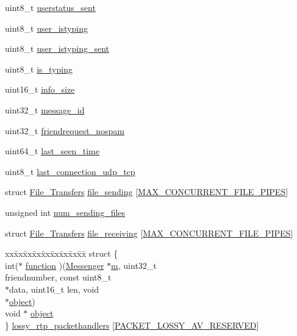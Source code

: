\begin{DoxyCompactItemize}
\item 
uint8\+\_\+t \hyperlink{struct_friend_af7c74fd36acb972c3a8641fb0781e37e}{userstatus\+\_\+sent}
\item 
uint8\+\_\+t \hyperlink{struct_friend_a68e945edd5a63c22371edf481c788d88}{user\+\_\+istyping}
\item 
uint8\+\_\+t \hyperlink{struct_friend_a8d9e9aef86444e0cde8ec0314f60907e}{user\+\_\+istyping\+\_\+sent}
\item 
uint8\+\_\+t \hyperlink{struct_friend_a4eb96aff01799d54246cc48854a47175}{is\+\_\+typing}
\item 
uint16\+\_\+t \hyperlink{struct_friend_ac0ae002db55ef8f8366de10ec005b65a}{info\+\_\+size}
\item 
uint32\+\_\+t \hyperlink{struct_friend_aa4420a99dd00b4884b23150e4226b2ea}{message\+\_\+id}
\item 
uint32\+\_\+t \hyperlink{struct_friend_a0fae9801a4789a368f90125119e31f3f}{friendrequest\+\_\+nospam}
\item 
uint64\+\_\+t \hyperlink{struct_friend_a8f99c48eb6b3ea472806495135ab6792}{last\+\_\+seen\+\_\+time}
\item 
uint8\+\_\+t \hyperlink{struct_friend_ac213b32e59c2e4a64923c453b100c4e4}{last\+\_\+connection\+\_\+udp\+\_\+tcp}
\item 
struct \hyperlink{struct_file___transfers}{File\+\_\+\+Transfers} \hyperlink{struct_friend_a51d0849a59878ad9e4b67123a1c87037}{file\+\_\+sending} \mbox{[}\hyperlink{_messenger_8h_a5e5c08c689138cd56d6c1a16d3eea793}{M\+A\+X\+\_\+\+C\+O\+N\+C\+U\+R\+R\+E\+N\+T\+\_\+\+F\+I\+L\+E\+\_\+\+P\+I\+P\+E\+S}\mbox{]}
\item 
unsigned int \hyperlink{struct_friend_ac4dcaccdfc6f354a321622e84b27b856}{num\+\_\+sending\+\_\+files}
\item 
struct \hyperlink{struct_file___transfers}{File\+\_\+\+Transfers} \hyperlink{struct_friend_ab14e1c3452717012d0bbb0dad068e9f6}{file\+\_\+receiving} \mbox{[}\hyperlink{_messenger_8h_a5e5c08c689138cd56d6c1a16d3eea793}{M\+A\+X\+\_\+\+C\+O\+N\+C\+U\+R\+R\+E\+N\+T\+\_\+\+F\+I\+L\+E\+\_\+\+P\+I\+P\+E\+S}\mbox{]}
\item 
\begin{tabbing}
xx\=xx\=xx\=xx\=xx\=xx\=xx\=xx\=xx\=\kill
struct \{\\
\>int($\ast$ \hyperlink{struct_friend_a726a4dcb820b33fd434494d56f532867}{function} )(\hyperlink{struct_messenger}{Messenger} $\ast$\hyperlink{_messenger__test_8c_aea6eb6c7c30a659f1b0dee83eaf03ea2}{m}, uint32\_t \\
\>\>friendnumber, const uint8\_t \\
\>\>$\ast$data, uint16\_t len, void \\
\>\>$\ast$\hyperlink{struct_friend_a077376d12464f945e2414d5499c79b3f}{object})\\
\>void $\ast$ \hyperlink{struct_friend_a077376d12464f945e2414d5499c79b3f}{object}\\
\} \hyperlink{struct_friend_af8c513c69f17fc044615b18ec03f9911}{lossy\_rtp\_packethandlers} \mbox{[}\hyperlink{_messenger_8h_a9e9b181fad5abaed171e4b4481490d1e}{PACKET\_LOSSY\_AV\_RESERVED}\mbox{]}\\


\end{tabbing}
\end{DoxyCompactItemize}
